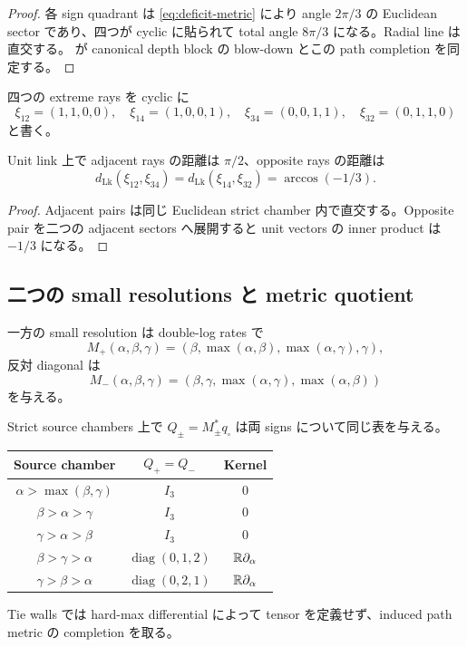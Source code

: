 \documentclass[11pt,a4paper]{ltjsarticle}
\newcommand{\Lk}{\operatorname{Lk}}\newcommand{\pGH}{\operatorname{pGH}}
\theoremstyle{plain}
\theoremstyle{definition}
\theoremstyle{remark}
\begin{document}
\begin{proof}
各 sign quadrant は \cref{eq:deficit-metric} により angle $2\pi/3$ の Euclidean sector であり、四つが cyclic に貼られて total angle $8\pi/3$ になる。Radial line は直交する。 が canonical depth block の blow-down とこの path completion を同定する。
\end{proof}

四つの extreme rays を cyclic に
\[
 \xi_{12}=(1,1,0,0),\quad
 \xi_{14}=(1,0,0,1),\quad
 \xi_{34}=(0,0,1,1),\quad
 \xi_{32}=(0,1,1,0)
\]
と書く。

\begin{corollary}\label{cor:square-distances}
Unit link 上で adjacent rays の距離は $\pi/2$、opposite rays の距離は
\[
 d_{\Lk}(\xi_{12},\xi_{34})
 =d_{\Lk}(\xi_{14},\xi_{32})
 =\arccos(-1/3).
\]
\end{corollary}

\begin{proof}
Adjacent pairs は同じ Euclidean strict chamber 内で直交する。Opposite pair を二つの adjacent sectors へ展開すると unit vectors の inner product は $-1/3$ になる。
\end{proof}

\subsection{二つの small resolutions と metric quotient}
一方の small resolution は double-log rates で
\[
 M_+(\alpha,\beta,\gamma)
 =(\beta,\max(\alpha,\beta),\max(\alpha,\gamma),\gamma),
\]
反対 diagonal は
\[
 M_-(\alpha,\beta,\gamma)
 =(\beta,\gamma,\max(\alpha,\gamma),\max(\alpha,\beta))
\]
を与える。

\begin{proposition}\label{prop:small-resolution-forms}
Strict source chambers 上で $Q_\pm=M_\pm^*q_{\square}$ は両 signs について同じ表を与える。
\begin{center}
\begin{tabular}{ccc}
\toprule
Source chamber & $Q_+=Q_-$ & Kernel\\ \midrule
$\alpha>\max(\beta,\gamma)$ & $I_3$ & $0$\\
$\beta>\alpha>\gamma$ & $I_3$ & $0$\\
$\gamma>\alpha>\beta$ & $I_3$ & $0$\\
$\beta>\gamma>\alpha$ & $\operatorname{diag}(0,1,2)$ & $\mathbb R\partial_\alpha$\\
$\gamma>\beta>\alpha$ & $\operatorname{diag}(0,2,1)$ & $\mathbb R\partial_\alpha$\\ \bottomrule
\end{tabular}
\end{center}
Tie walls では hard-max differential によって tensor を定義せず、induced path metric の completion を取る。
\end{proposition}
\end{document}
